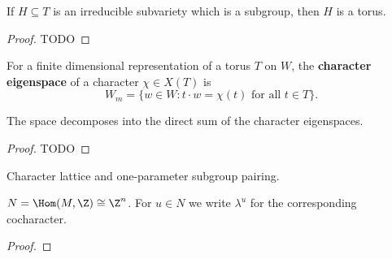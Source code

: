 \begin{proposition}
  \label{1-1-1-subgroup-subtorus}

  If $H \subseteq T$ is an irreducible subvariety which is a subgroup, then $H$ is a torus.
\end{proposition}
\begin{proof}

  TODO
\end{proof}


\begin{definition}
  \label{1-1-char-eigenspace}

  For a finite dimensional representation of a torus $T$ on $W$, the {\bf character eigenspace} of a character $\chi \in X(T)$ is
  \[
    W_m = \{w\in W : t\cdot w = \chi(t)\text{ for all } t\in T \}.
  \]
\end{definition}


\begin{proposition}
  \label{1-1-2-char-eigenspace-direct-sum}

  The space decomposes into the direct sum of the character eigenspaces.
\end{proposition}
\begin{proof}
  \uses{}

  TODO
\end{proof}


\begin{definition}
  \label{1-1-char-cochar-pairing}

  Character lattice and one-parameter subgroup pairing.
\end{definition}


\begin{proposition}
  \label{1-1-cochar-torus}

  $N = \Hom(M, \Z) \cong \Z^n$. For $u \in N$ we write $\lambda^u$ for the corresponding cocharacter.
\end{proposition}
\begin{proof}

\end{proof}



